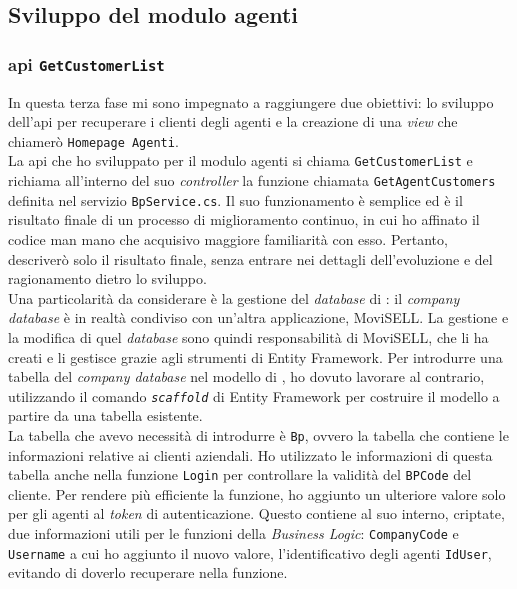 \subsection{Sviluppo del modulo agenti}
\subsubsection{\gls{api} \texttt{GetCustomerList}}
In questa terza fase mi sono impegnato a raggiungere due obiettivi: lo sviluppo dell'\gls{api} per recuperare i clienti degli 
agenti e la creazione di una \textit{view} che chiamerò \texttt{Homepage Agenti}.\\
La \gls{api} che ho  sviluppato per il modulo agenti si chiama \texttt{GetCustomerList} e richiama all'interno del suo \textit{controller} 
la funzione chiamata \texttt{GetAgentCustomers} definita nel servizio \texttt{BpService.cs}.
Il suo funzionamento è semplice ed è il risultato finale di un processo di miglioramento continuo, in cui ho affinato il codice 
man mano che acquisivo maggiore familiarità con esso. Pertanto, descriverò solo il risultato finale, senza entrare nei dettagli 
dell'evoluzione e del ragionamento dietro lo sviluppo.\\
Una particolarità da considerare è la gestione del \textit{database} di {\movi}: il \textit{company database} è in realtà condiviso 
con un'altra applicazione, MoviSELL. La gestione e la modifica di quel \textit{database} sono quindi responsabilità di MoviSELL, 
che li ha creati e li gestisce grazie agli strumenti di Entity Framework. Per introdurre una tabella del \textit{company database} 
nel modello di {\movi}, ho dovuto lavorare al contrario, utilizzando il comando \texttt{\textit{scaffold}} di Entity Framework per costruire 
il modello a partire da una tabella esistente.\\
La tabella che avevo necessità di introdurre è \texttt{Bp}, ovvero la tabella che contiene le informazioni relative ai clienti 
aziendali. Ho utilizzato le informazioni di questa tabella anche nella funzione \texttt{Login} per controllare la validità del \texttt{BPCode} del cliente. 
Per rendere più efficiente la funzione, ho aggiunto un ulteriore valore solo per gli agenti al \textit{token} di autenticazione. 
Questo contiene al suo interno, criptate, due informazioni utili per le funzioni della \textit{Business Logic}: \texttt{CompanyCode} 
e \texttt{Username} a cui ho aggiunto il nuovo valore, l'identificativo degli agenti \texttt{IdUser}, evitando di doverlo recuperare 
nella funzione.\\
